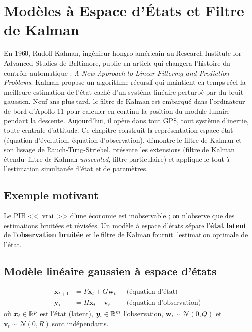 \chapter{Mod\`eles \`a Espace d'\'Etats et Filtre de Kalman}
\label{ch:kalman}

En 1960, Rudolf Kalman, ingénieur hongro-américain au Research Institute for Advanced Studies de Baltimore, publie un article qui changera l'histoire du contrôle automatique : \emph{A New Approach to Linear Filtering and Prediction Problems}. Kalman propose un algorithme récursif qui maintient en temps réel la meilleure estimation de l'état caché d'un système linéaire perturbé par du bruit gaussien. Neuf ans plus tard, le filtre de Kalman est embarqué dans l'ordinateur de bord d'Apollo 11 pour calculer en continu la position du module lunaire pendant la descente. Aujourd'hui, il opère dans tout GPS, tout système d'inertie, toute centrale d'attitude. Ce chapitre construit la représentation espace-état (équation d'évolution, équation d'observation), démontre le filtre de Kalman et son lissage de Rauch-Tung-Striebel, présente les extensions (filtre de Kalman étendu, filtre de Kalman \emph{unscented}, filtre particulaire) et applique le tout à l'estimation simultanée d'état et de paramètres.

\section{Exemple motivant}
Le PIB <<~vrai~>> d'une \'economie est inobservable ; on n'observe que des estimations bruit\'ees et r\'evis\'ees. Un mod\`ele \`a espace d'\'etats s\'epare l'\textbf{\'etat latent} de l'\textbf{observation bruit\'ee} et le filtre de Kalman fournit l'estimation optimale de l'\'etat.

\section{Mod\`ele lin\'eaire gaussien \`a espace d'\'etats}

\begin{definition}
\begin{align}
\bm{x}_{t+1} &= F\bm{x}_t + G\bm{w}_t && \text{(\'equation d'\'etat)} \label{eq:state}\\
\bm{y}_t &= H\bm{x}_t + \bm{v}_t && \text{(\'equation d'observation)} \label{eq:obs}
\end{align}
o\`u $\bm{x}_t\in\mathbb{R}^p$ est l'\'etat (latent), $\bm{y}_t\in\mathbb{R}^m$ l'observation, $\bm{w}_t\sim\mathcal{N}(0,Q)$ et $\bm{v}_t\sim\mathcal{N}(0,R)$ sont ind\'ependants.
\end{definition}

